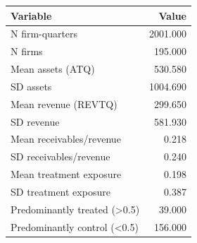 \begin{tabular}[t]{lr}
\toprule
Variable & Value\\
\midrule
N firm-quarters & 2001.000\\
N firms & 195.000\\
Mean assets (ATQ) & 530.580\\
SD assets & 1004.690\\
Mean revenue (REVTQ) & 299.650\\
\addlinespace
SD revenue & 581.930\\
Mean receivables/revenue & 0.218\\
SD receivables/revenue & 0.240\\
Mean treatment exposure & 0.198\\
SD treatment exposure & 0.387\\
\addlinespace
Predominantly treated (>0.5) & 39.000\\
Predominantly control (<0.5) & 156.000\\
\bottomrule
\end{tabular}
